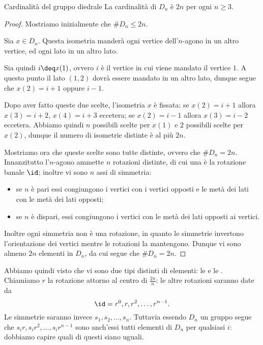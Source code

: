 \begin{proposition}
    {Cardinalità del gruppo diedrale}{} 
    La cardinalità di $D_n$ è $2n$ per ogni $n \geq 3$.
\end{proposition}
\begin{proof}
    Mostriamo inizialmente che $\#D_n \leq 2n$.

    Sia $x \in D_n$. Questa isometria manderà ogni vertice dell'$n$-agono in un altro vertice, ed ogni lato in un altro lato. 
    
    Sia quindi $i \deq x(1)$, ovvero $i$ è il vertice in cui viene mandato il vertice $1$. A questo punto il lato $(1, 2)$ dovrà essere mandato in un altro lato, dunque segue che $x(2) = i+1$ oppure $i-1$. 
    
    Dopo aver fatto queste due scelte, l'isometria $x$ è fissata: se $x(2) = i+1$ allora $x(3) = i+2$, $x(4) = i+3$ eccetera; se $x(2) = i-1$ allora $x(3)=i-2$ eccetera. Abbiamo quindi $n$ possibili scelte per $x(1)$ e $2$ possibili scelte per $x(2)$, dunque il numero di isometrie distinte è al più $2n$. 

    Mostriamo ora che queste scelte sono tutte distinte, ovvero che $\#D_n = 2n$. Innanzitutto l'$n$-agono ammette $n$ rotazioni distinte, di cui una è la rotazione banale $\id$; inoltre vi sono $n$ assi di simmetria:
    \begin{itemize}
        \item se $n$ è pari essi congiungono i vertici con i vertici opposti e le metà dei lati con le metà dei lati opposti;
        \item se $n$ è dispari, essi congiungono i vertici con le metà dei lati opposti ai vertici.
    \end{itemize}
    Inoltre ogni simmetria non è una rotazione, in quanto le simmetrie invertono l'orientazione dei vertici mentre le rotazioni la mantengono. Dunque vi sono almeno $2n$ elementi in $D_n$, da cui segue che $\#D_n = 2n$.
\end{proof}

Abbiamo quindi visto che vi sono due tipi distinti di elementi: le  e le . Chiamiamo $r$ la rotazione attorno al centro di $\frac{2\pi}{n}$: le altre rotazioni saranno date da \[
    \id = r^0, r, r^2, \dots, r^{n-1}
.\] Le simmetrie saranno invece $s_1, s_2, \dots, s_n$. Tuttavia essendo $D_n$ un gruppo segue che $s_ir, s_ir^2, \dots, s_ir^{n-1}$ sono anch'essi tutti elementi di $D_n$ per qualsiasi $i$: dobbiamo capire quali di questi siano uguali.

